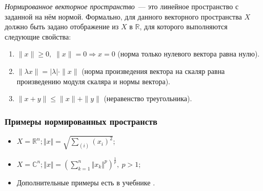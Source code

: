\textit{Нормированное векторное пространство}~--- это линейное пространство с заданной на нём нормой. Формально, для данного векторного пространства $X$ должно быть задано отображение из $X$ в $\mathbb{R}$, для которого выполняются следующие свойства:
\begin{enumerate}
	\itemsep0em
	\item $\|x\|\geqslant 0,\;\|x\|=0\Rightarrow x=0$ (норма только нулевого вектора равна нулю).
	\item $\|\lambda x\|=|\lambda |\cdot \|x\|$ (норма произведения вектора на скаляр равна произведению модуля скаляра и нормы вектора).
	\item $\|x+y\|\leqslant \|x\|+\|y\|$ (неравенство треугольника).
\end{enumerate}

\subsubsection*{Примеры нормированных пространств}
\begin{itemize}
	\itemsep0em
	\item $X = \mathbb{R}^{n}; \Vert x \Vert = \sqrt{\sum_{(i)}(x_{i})^{2}}$;
	\item $\displaystyle X = \mathbb{C}^n; \Vert x \Vert = \left(\sum_{k=1}^{n}\Vert x_k \Vert^p\right)^{\frac{1}{p}},\:p > 1$;
	\item Дополнительные примеры есть в учебнике \cite[с.~22]{trenogin}.
\end{itemize}